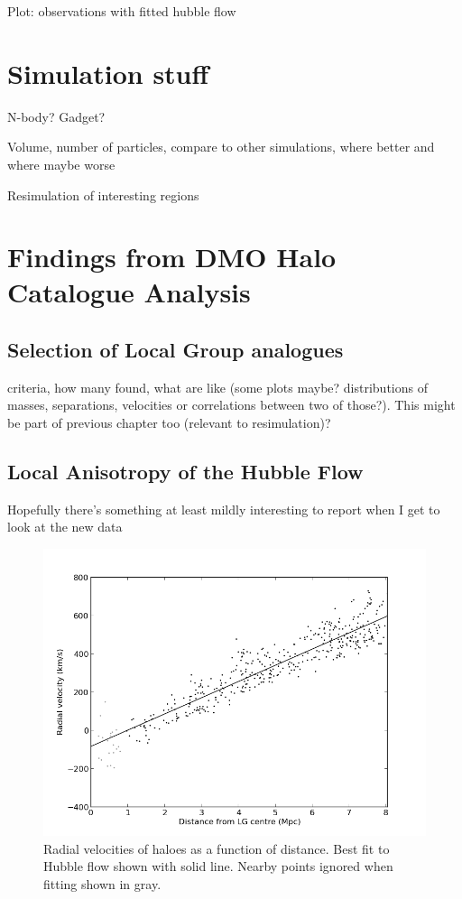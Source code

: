 \documentclass[english, oneside]{HYgradu}
\begin{document}
Plot: observations with fitted hubble flow


\chapter{Simulation stuff}
N-body? Gadget?

Volume, number of particles, compare to other simulations, where better and where maybe worse

Resimulation of interesting regions

\chapter{Findings from DMO Halo Catalogue Analysis}
\section{Selection of Local Group analogues}
criteria, how many found, what are like (some plots maybe? distributions of masses, separations, velocities or correlations between two of those?). This might be part of previous chapter too (relevant to resimulation)?

\section{Local Anisotropy of the Hubble Flow}
Hopefully there's something at least mildly interesting to report when I get to look at the new data


\begin{figure}
   \centering
   \includegraphics[width=\textwidth]{kuvat/hubbleflow.png}
   \caption{Radial velocities of haloes as a function of distance. Best fit to Hubble flow shown with solid line. Nearby points ignored when fitting shown in gray.}\label{fig:hubbleflow}
\end{figure}
\end{document}
